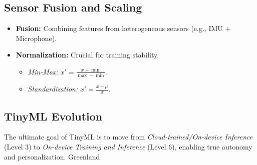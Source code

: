 \subsection{Sensor Fusion and Scaling}
\begin{itemize}
    \item \textbf{Fusion:} Combining features from heterogeneous sensors (e.g., IMU + Microphone).
    \item \textbf{Normalization:} Crucial for training stability.
    \begin{itemize}
        \item \textit{Min-Max:} $x' = \frac{x - \min}{\max - \min}$.
        \item \textit{Standardization:} $x' = \frac{x - \mu}{\sigma}$.
    \end{itemize}
\end{itemize}

\subsection{TinyML Evolution}
The ultimate goal of TinyML is to move from \textit{Cloud-trained/On-device Inference} (Level 3) to \textit{On-device Training and Inference} (Level 6), enabling true autonomy and personalization.
 Greenland
